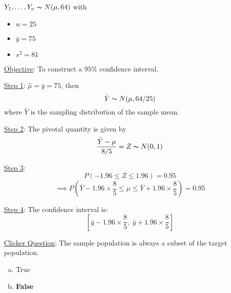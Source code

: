 \begin{exbox}
    \begin{example}
        $ Y_1,\ldots ,Y_n \thicksim N(\mu,64) $ with
        \begin{itemize}
            \item $ n=25 $
            \item $ \bar{y}=75 $
            \item $ s^2=81 $
        \end{itemize}
        \underline{Objective}: To construct a $ 95\% $ confidence interval.

        \underline{Step 1}: $ \hat{\mu}=\bar{y}=75 $, then
        \[ \bar{Y} \thicksim N(\mu,64/25) \]
        where $ \bar{Y} $ is the sampling distribution of the sample mean.

        \underline{Step 2}: The pivotal quantity is given by
        \[ \frac{\bar{Y}-\mu}{8/5} =Z \thicksim N(0,1) \]

        \underline{Step 3}:
        \[ P\left(-1.96\leqslant Z\leqslant 1.96\right)=0.95 \]
        \[ \implies P\left( \bar{Y}-1.96\times \frac{8}{5} \leqslant \mu
            \leqslant \bar{Y}+1.96\times \frac{8}{5} \right)=0.95 \]

        \underline{Step 4}: The confidence interval is:
        \[ \left[ \bar{y}-1.96\times \frac{8}{5},\;\bar{y}+1.96\times \frac{8}{5} \right] \]
    \end{example}
\end{exbox}

\underline{Clicker Question}: The sample population is always a subset of the target
population.
\begin{enumerate}[(a)]
    \item True
    \item \textbf{False}
\end{enumerate}
